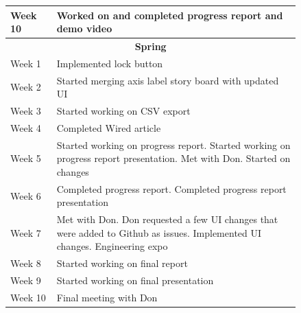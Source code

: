 \documentclass[onecolumn, draftclsnofoot,10pt, compsoc]{IEEEtran}
\begin{document}
\begin{center}
\begin{longtable}{| l | p{0.84\linewidth}|}
    Week 10 & Worked on and completed progress report and demo video \\ \hline
    \multicolumn{2}{c}{\textbf{Spring}} \\ \hline
    Week 1 & Implemented lock button \\ \hline
	Week 2 & Started merging axis label story board with updated UI \\ \hline
	Week 3 & Started working on CSV export \\ \hline
	Week 4 & Completed Wired article \\ \hline
    Week 5 & Started working on progress report. Started working on progress report presentation. Met with Don. Started on changes \\ \hline
    Week 6 & Completed progress report. Completed progress report presentation \\ \hline
	Week 7 & Met with Don. Don requested a few UI changes that were added to Github as issues. Implemented UI changes. Engineering expo \\ \hline
	Week 8 & Started working on final report \\ \hline
	Week 9 & Started working on final presentation \\ \hline
    Week 10 & Final meeting with Don
\\ \hline
\end{longtable}
\end{center}
\end{document}
